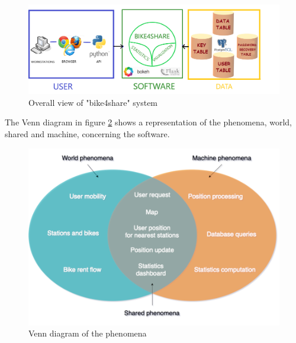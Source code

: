 \documentclass{article}
\begin{document}
\begin{figure}[h]
    \centering
    \includegraphics[width=0.75\linewidth]{image/BIKE4SHARE_SCHEMA_FINAL.png}
    \caption{Overall view of "bike4share" system}
    \label{fig:schema}
\end{figure}
The Venn diagram in figure \ref{fig:venn} shows a representation of the phenomena, world, shared and machine,  concerning the software.\\
\begin{figure}[h]
    \centering
    \includegraphics[width=0.75\linewidth]{image/venn.png}
    \caption{Venn diagram of the phenomena}
    \label{fig:venn}
\end{figure}\\\\
\end{document}
